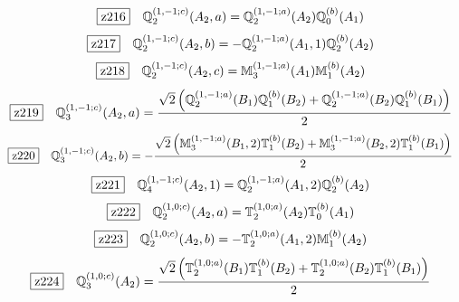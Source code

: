 \documentclass[fleqn,10pt,landscape]{jsarticle}
\begin{document}
\begin{dmath*}
\hspace*{3mm}\fbox{z216}\quad \mathbb{Q}_{2}^{(1,-1;c)}(A_{2},a)=\mathbb{Q}_{2}^{(1,-1;a)}(A_{2}) \mathbb{Q}_{0}^{(b)}(A_{1})
\end{dmath*}
\begin{dmath*}
\hspace*{3mm}\fbox{z217}\quad \mathbb{Q}_{2}^{(1,-1;c)}(A_{2},b)=- \mathbb{Q}_{2}^{(1,-1;a)}(A_{1},1) \mathbb{Q}_{2}^{(b)}(A_{2})
\end{dmath*}
\begin{dmath*}
\hspace*{3mm}\fbox{z218}\quad \mathbb{Q}_{2}^{(1,-1;c)}(A_{2},c)=\mathbb{M}_{3}^{(1,-1;a)}(A_{1}) \mathbb{M}_{1}^{(b)}(A_{2})
\end{dmath*}
\begin{dmath*}
\hspace*{3mm}\fbox{z219}\quad \mathbb{Q}_{3}^{(1,-1;c)}(A_{2},a)=\frac{\sqrt{2} \left(\mathbb{Q}_{2}^{(1,-1;a)}(B_{1}) \mathbb{Q}_{1}^{(b)}(B_{2}) + \mathbb{Q}_{2}^{(1,-1;a)}(B_{2}) \mathbb{Q}_{1}^{(b)}(B_{1})\right)}{2}
\end{dmath*}
\begin{dmath*}
\hspace*{3mm}\fbox{z220}\quad \mathbb{Q}_{3}^{(1,-1;c)}(A_{2},b)=- \frac{\sqrt{2} \left(\mathbb{M}_{3}^{(1,-1;a)}(B_{1},2) \mathbb{T}_{1}^{(b)}(B_{2}) + \mathbb{M}_{3}^{(1,-1;a)}(B_{2},2) \mathbb{T}_{1}^{(b)}(B_{1})\right)}{2}
\end{dmath*}
\begin{dmath*}
\hspace*{3mm}\fbox{z221}\quad \mathbb{Q}_{4}^{(1,-1;c)}(A_{2},1)=\mathbb{Q}_{2}^{(1,-1;a)}(A_{1},2) \mathbb{Q}_{2}^{(b)}(A_{2})
\end{dmath*}
\begin{dmath*}
\hspace*{3mm}\fbox{z222}\quad \mathbb{Q}_{2}^{(1,0;c)}(A_{2},a)=\mathbb{T}_{2}^{(1,0;a)}(A_{2}) \mathbb{T}_{0}^{(b)}(A_{1})
\end{dmath*}
\begin{dmath*}
\hspace*{3mm}\fbox{z223}\quad \mathbb{Q}_{2}^{(1,0;c)}(A_{2},b)=- \mathbb{T}_{2}^{(1,0;a)}(A_{1},2) \mathbb{M}_{1}^{(b)}(A_{2})
\end{dmath*}
\begin{dmath*}
\hspace*{3mm}\fbox{z224}\quad \mathbb{Q}_{3}^{(1,0;c)}(A_{2})=\frac{\sqrt{2} \left(\mathbb{T}_{2}^{(1,0;a)}(B_{1}) \mathbb{T}_{1}^{(b)}(B_{2}) + \mathbb{T}_{2}^{(1,0;a)}(B_{2}) \mathbb{T}_{1}^{(b)}(B_{1})\right)}{2}
\end{dmath*}
\end{document}
